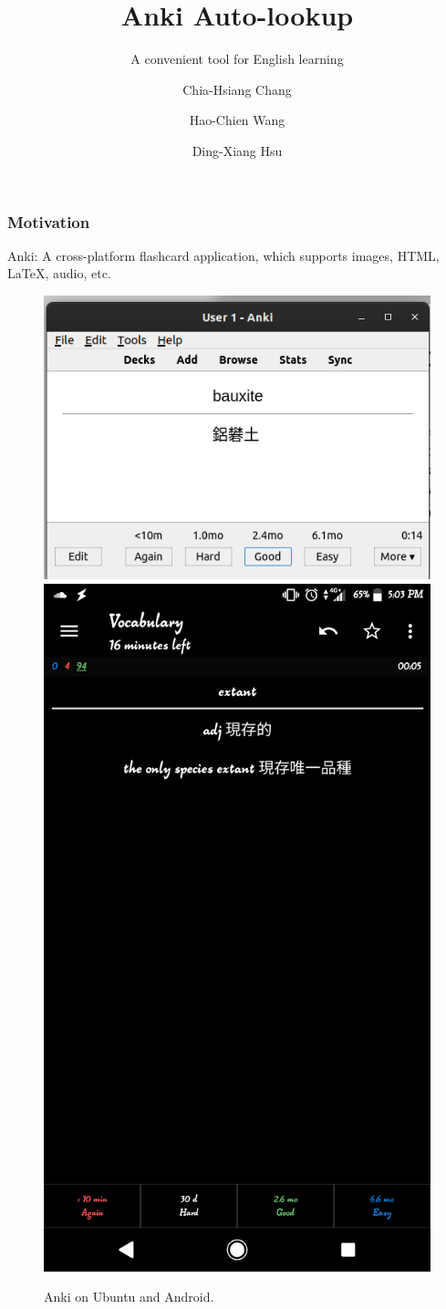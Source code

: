 \documentclass{beamer}
\title{Anki Auto-lookup}
\subtitle{A convenient tool for English learning}
\author[Chiang, Wang, Hsu]
{Chia-Hsiang Chang\inst{1} \and Hao-Chien Wang\inst{2} \and Ding-Xiang Hsu \inst{2}}
\institute[NTU] %
{
	\inst{1}%
	Department of Electrical Engineering\\
	National Taiwan University
	\and
	\inst{2}%
	Department of Physics\\
	National Taiwan University
}
\begin{document}
\frame{\titlepage} 

\begin{frame}
	\frametitle{Motivation}
	Anki: A cross-platform flashcard application, which supports images, HTML,
	\LaTeX, audio, etc.
	\begin{figure}[h]
		\centering
		\includegraphics[width=0.55\linewidth]{./ankidesktop.png}
		\includegraphics[width=0.28\linewidth]{./ankidroid.png}
		\caption{Anki on Ubuntu and Android.
		\label{fig:anki}}
	\end{figure}
\end{frame}
\end{document}
